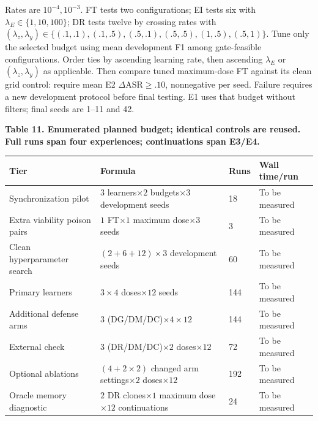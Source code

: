 \documentclass[10pt,a4paper]{article}
\begin{document}
Rates are $10^{-4},10^{-3}$. FT tests two configurations; EI tests six with $\lambda_E\in\{1,10,100\}$; DR tests twelve by crossing rates with $(\lambda_z,\lambda_y)\in\{(.1,.1),(.1,.5),(.5,.1),(.5,.5),(1,.5),(.5,1)\}$. Tune only the selected budget using mean development F1 among gate-feasible configurations. Order ties by ascending learning rate, then ascending $\lambda_E$ or $(\lambda_z,\lambda_y)$ as applicable. Then compare tuned maximum-dose FT against its clean grid control: require mean E2 $\Delta\mathrm{ASR}\ge.10$, nonnegative per seed. Failure requires a new development protocol before final testing. E1 uses that budget without filters; final seeds are 1--11 and 42.


\centering\footnotesize
\par\textbf{Table 11. Enumerated planned budget; identical controls are reused. Full runs span four experiences; continuations span E3/E4.}\par


\begin{longtable}{l p{4.8cm}p{1.1cm}p{2.5cm}}
\toprule
Tier & Formula & Runs & Wall time/run\\
\midrule
Synchronization pilot & $3$ learners$\times2$ budgets$\times3$ development seeds & 18 & To be measured\\
Extra viability poison pairs & $1$ FT$\times1$ maximum dose$\times3$ seeds & 3 & To be measured\\
Clean hyperparameter search & $(2+6+12)\times3$ development seeds & 60 & To be measured\\
Primary learners & $3\times4$ doses$\times12$ seeds & 144 & To be measured\\
Additional defense arms & $3$ (DG/DM/DC)$\times4\times12$ & 144 & To be measured\\
External check & $3$ (DR/DM/DC)$\times2$ doses$\times12$ & 72 & To be measured\\
Optional ablations & $(4+2\times2)$ changed arm settings$\times2$ doses$\times12$ & 192 & To be measured\\
Oracle memory diagnostic & $2$ DR clones$\times1$ maximum dose$\times12$ continuations & 24 & To be measured\\
\bottomrule
\end{longtable}
\end{document}
